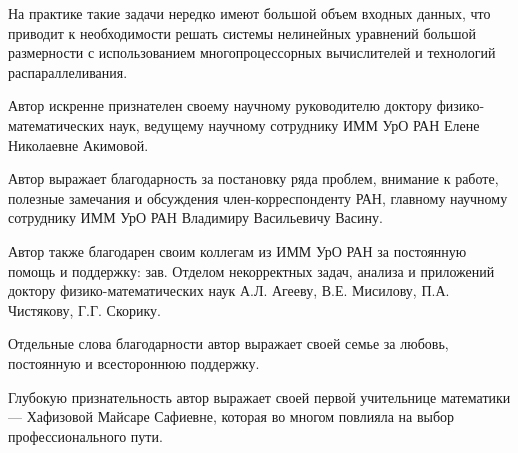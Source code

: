 \intro

%
%

\actualitysection
\actualitytext

На практике такие задачи нередко имеют большой объем входных данных, что приводит к необходимости решать системы нелинейных уравнений большой размерности с использованием многопроцессорных вычислителей и технологий распараллеливания.


\developmentsection
\developmenttext

\objectivesection
\objectivetext

\methodssection
\methodstext

\noveltysection
\noveltytext

{}


\approbationsection
\approbationtext

\pubsection
\pubtext

\contribsection
\contribtext

\structsection
\structtext

Автор искренне признателен своему научному руководителю доктору физико-математических наук, ведущему научному сотруднику ИММ УрО РАН Елене Николаевне Акимовой.

Автор выражает благодарность за постановку ряда проблем, внимание к работе, полезные замечания и обсуждения член-корреспонденту РАН, главному научному сотруднику ИММ УрО РАН Владимиру Васильевичу Васину.

Автор также благодарен своим коллегам из ИММ УрО РАН за постоянную помощь и поддержку: зав. Отделом некорректных задач, анализа и приложений доктору физико-математических наук А.Л. Агееву, В.Е. Мисилову, П.А. Чистякову, Г.Г. Скорику.

Отдельные слова благодарности автор выражает своей семье за любовь, постоянную и всестороннюю поддержку.

Глубокую признательность автор выражает своей первой учительнице математики --- Хафизовой Майсаре Сафиевне, которая во многом повлияла на выбор профессионального пути.


